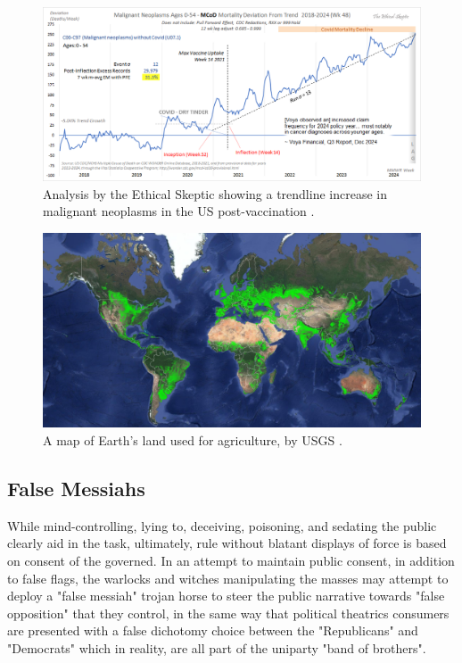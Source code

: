 \documentclass[10pt,twocolumn,letterpaper]{article}
\begin{document}
\begin{figure}[t]
\begin{center}
\includegraphics[width=1\textwidth]{tes2.png}
\end{center}
   \caption{Analysis by the Ethical Skeptic showing a trendline increase in malignant neoplasms in the US post-vaccination \cite{42}.}
   \label{fig:19}
\end{figure}

\clearpage
\twocolumn

\begin{figure}[t]
\begin{center}
\includegraphics[width=1\textwidth]{farmcrop.PNG}
\end{center}
   \caption{A map of Earth's land used for agriculture, by USGS \cite{45}.}
   \label{fig:20}
\end{figure}

\subsection{False Messiahs}

While mind-controlling, lying to, deceiving, poisoning, and sedating the public clearly aid in the task, ultimately, rule without blatant displays of force is based on consent of the governed. In an attempt to maintain public consent, in addition to false flags, the warlocks and witches manipulating the masses may attempt to deploy a "false messiah" trojan horse to steer the public narrative towards "false opposition" that they control, in the same way that political theatrics consumers are presented with a false dichotomy choice between the "Republicans" and "Democrats" which in reality, are all part of the uniparty "band of brothers".
\end{document}
